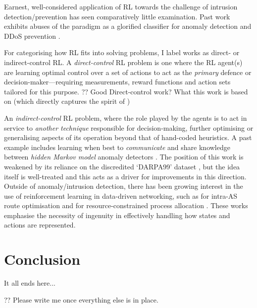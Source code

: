 \documentclass[conference, letterpaper, 10pt, times]{IEEEtran}
\begin{document}
Earnest, well-considered application of RL towards the challenge of intrusion detection/prevention has seen comparatively little examination.
Past work exhibits abuses of the paradigm as a glorified classifier for anomaly detection \cite{shamshirband2014anomaly} and DDoS prevention \cite{DBLP:conf/mates/ServinK08}.

For categorising how RL fits into solving problems, I label works as direct- or indirect-control RL.
A \emph{direct-control} RL problem is one where the RL agent(s) are learning optimal control over a set of actions to act as the \emph{primary} defence or decision-maker---requiring measurements, reward functions and action sets tailored for this purpose.
?? Good Direct-control work? What this work is based on (which directly captures the spirit of ) \cite{DBLP:phd/ethos/Malialis14, DBLP:journals/eaai/MalialisK15}

An \emph{indirect-control} RL problem, where the role played by the agents is to act in service to \emph{another technique} responsible for decision-making, further optimising or generalising aspects of its operation beyond that of hand-coded heuristics.
A past example includes learning when best to \emph{communicate} and share knowledge between \emph{hidden Markov model} anomaly detectors \cite{DBLP:conf/paisi/XuSH07}.
The position of this work is weakened by its reliance on the discredited `DARPA99' dataset \cite{DARPA-IDD, DBLP:conf/cisda/TavallaeeBLG09, DBLP:conf/sp/SommerP10}, but the idea itself is well-treated and this acts as a driver for improvements in this direction.
Outside of anomaly/intrusion detection, there has been growing interest in the use of reinforcement learning in data-driven networking, such as for intra-AS route optimisation \cite{DBLP:conf/hotnets/ValadarskySST17} and for resource-constrained process allocation \cite{DBLP:conf/hotnets/MaoAMK16}.
These works emphasise the necessity of ingenuity in effectively handling how states and actions are represented.

\section{Conclusion}

It all ends here...

?? Please write me once everything else is in place.
\end{document}
